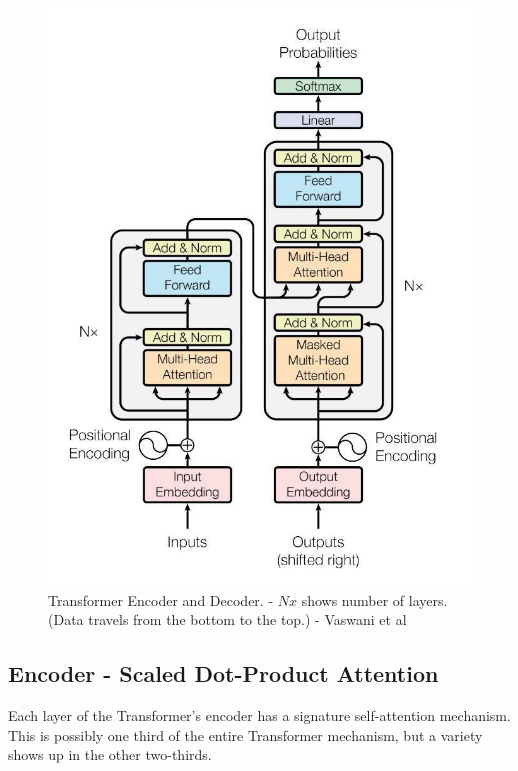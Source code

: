 \begin{figure}[H]
	\begin{center}
		
		
		\includegraphics[scale=1.5]{diagram-mat04}
	\end{center}
	\caption[Transformer Encoder and Decoder]{Transformer Encoder and Decoder. - $Nx$ shows number of layers. (Data travels from the bottom to the top.) - Vaswani et al \cite{Vaswani2017AttentionIA}}
	
	
\end{figure}

\subsection{Encoder - Scaled Dot-Product Attention}

Each layer of the Transformer's encoder has a signature self-attention mechanism. This is possibly one third of the entire Transformer mechanism, but a variety shows up in the other two-thirds. 

